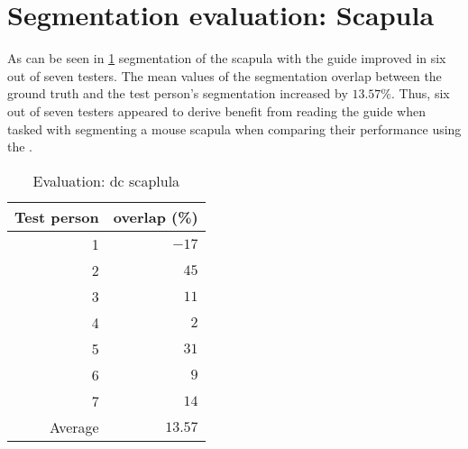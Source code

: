 \section{Segmentation evaluation: Scapula}\label{s:seg-eval-scapula}
As can be seen in \cref{tab:scapula-overlap} segmentation of the scapula with the guide improved in six out of seven testers.
The mean values of the segmentation overlap between the ground truth and the test person's segmentation increased by $13.57\%$.
Thus, six out of seven testers appeared to derive benefit from reading the guide when tasked with segmenting a 
mouse scapula when comparing their performance using the .
\begin{table}[ht]
	\begin{center}
		\begin{tabular}{r r}
			\textbf{Test person} & \textbf{overlap (\%)} \\
			\hline
			1                    & $-17$                 \\
			2                    & $45$                  \\
			3                    & $11$                  \\
			4                    & $2$                   \\
			5                    & $31$                  \\
			6                    & $9$                   \\
			7                    & $14$                  \\
			\hline
			Average              & $13.57$               \\
		\end{tabular}
		\caption{Evaluation: \acrshort{dc} scaplula}\label{tab:scapula-overlap}
	\end{center}
\end{table}

